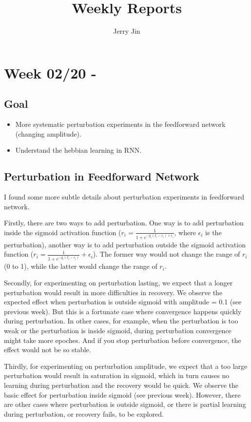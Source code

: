 \documentclass[12pt, a4paper]{article}
\title{Weekly Reports}
\author{Jerry Jin}
\begin{document}
\maketitle

\section*{Week 02/20 - }

\subsection*{Goal}

\noindent
\begin{itemize}
    \item More systematic perturbation experiments in the feedforward network (changing amplitude).
    \item Understand the hebbian learning in RNN.
\end{itemize}

\subsection*{Perturbation in Feedforward Network}

I found some more subtle details about perturbation experiments in feedforward network.

Firstly, there are two ways to add perturbation. One way is to add perturbation inside the sigmoid activation function ($r_i = \frac{1}{1 + e^{-g_i(I_i-s_i) + \epsilon_i}}$, where $\epsilon_i$ is the perturbation), another way is to add perturbation outside the sigmoid activation function ($r_i = \frac{1}{1 + e^{-g_i(I_i-s_i)}} + \epsilon_i$). The former way would not change the range of $r_i$ (0 to 1), while the latter would change the range of $r_i$.

Secondly, for experimenting on perturbation lasting, we expect that a longer perturbation would result in more difficulties in recovery. We observe the expected effect when perturbation is outside sigmoid with amplitude = 0.1 (see previous week). But this is a fortunate case where convergence happens quickly during perturbation. In other cases, for example, when the perturbation is too weak or the perturbation is inside sigmoid, during perturbation convergence might take more epoches. And if you stop perturbation before convergence, the effect would not be so stable.

Thirdly, for experimenting on perturbation amplitude, we expect that a too large perturbation would result in saturation in sigmoid, which in turn causes no learning during perturbation and the recovery would be quick. We observe the basic effect for perturbation inside sigmoid (see previous week). However, there are other cases where perturbation is outside sigmoid, or there is partial learning during perturbation, or recovery fails, to be explored.
\end{document}
